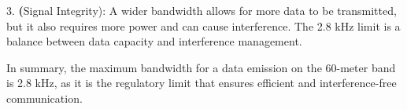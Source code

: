 3. \textbf(Signal Integrity): A wider bandwidth allows for more data to be transmitted, but it also requires more power and can cause interference. The 2.8 kHz limit is a balance between data capacity and interference management.

In summary, the maximum bandwidth for a data emission on the 60-meter band is 2.8 kHz, as it is the regulatory limit that ensures efficient and interference-free communication.

